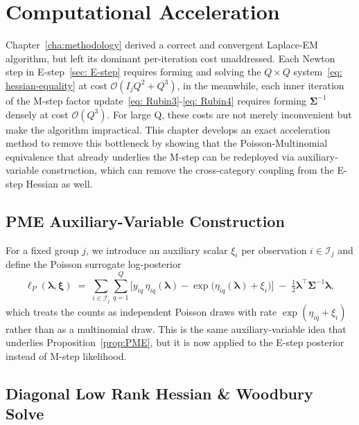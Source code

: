 \chapter{Computational Acceleration}
\label{cha:computational-acceleration}

Chapter~\ref{cha:methodology} derived a correct and convergent Laplace-EM algorithm, but left its dominant per-iteration cost unaddressed. Each Newton step in E-step~\ref{sec: E-step} requires forming and solving the $Q\times Q$ system~\eqref{eq: hessian-equality} at cost $\mathcal{O}(I_{j}Q^{2}+Q^{3})$, in the meanwhile, each inner iteration of the M-step factor update~\eqref{eq: Rubin3}-\eqref{eq: Rubin4} requires forming $\bm{\Sigma}^{-1}$ densely at cost $\mathcal{O}(Q^{3})$. For large Q, these costs are not merely inconvenient but make the algorithm impractical. This chapter develops an exact acceleration method to remove this bottleneck by showing that the Poisson-Multinomial equivalence that already underlies the M-step can be redeployed via auxiliary-variable construction, which can remove the cross-category coupling from the E-step Hessian as well. 

\section{PME Auxiliary-Variable Construction}
\label{sec:auxiliary-variable-construction}

For a fixed group $j$, we introduce an auxiliary scalar $\xi_{i}$ per observation $i\in \mathcal{I}_{j}$ and define the Poisson surrogate log-posterior
\begin{equation}
    \ell_P(\boldsymbol{\lambda}, \boldsymbol{\xi}) \;=\; \sum_{i \in \mathcal{I}_j} \sum_{q=1}^{Q} \Big[ y_{iq}\, \eta_{iq}(\boldsymbol{\lambda}) - \exp\big(\eta_{iq}(\boldsymbol{\lambda}) + \xi_i\big) \Big] \;-\; \tfrac{1}{2} \boldsymbol{\lambda}^\top \boldsymbol{\Sigma}^{-1} \boldsymbol{\lambda},
\end{equation}
which treats the counts as independent Poisson draws with rate $\exp{(\eta_{iq}+\xi_{i})}$ rather than as a multinomial draw. This is the same auxiliary-variable idea that underlies Proposition~\ref{prop:PME}, but it is now applied to the E-step posterior instead of M-step likelihood.

\section{Diagonal Low Rank Hessian \& Woodbury Solve}
\label{sec:diagonal-low-rank-hessian}

